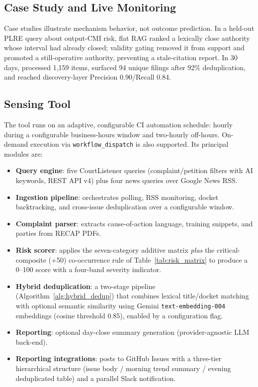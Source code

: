 \subsection{Case Study and Live Monitoring}

Case studies illustrate mechanism behavior, not outcome prediction. In a held-out PLRE query about output-CMI risk, flat RAG ranked a lexically close authority whose interval had already closed; validity gating removed it from support and promoted a still-operative authority, preventing a stale-citation report. In 30 days, \trackername{} processed 1{,}159 items, surfaced 94 unique filings after 92\% deduplication, and reached discovery-layer Precision 0.90/Recall 0.84.

\subsection{Sensing Tool}


The \trackername{} tool runs on an adaptive, configurable CI automation schedule: hourly during a configurable business-hours window and two-hourly off-hours. On-demand execution via \texttt{workflow\_dispatch} is also supported. Its principal modules are:

\begin{itemize}
  \item \textbf{Query engine}: five CourtListener queries (complaint/petition filters with AI keywords, REST API v4) plus four news queries over Google News RSS.
  \item \textbf{Ingestion pipeline}: orchestrates polling, RSS monitoring, docket backtracking, and cross-issue deduplication over a configurable window.
  \item \textbf{Complaint parser}: extracts cause-of-action language, training snippets, and parties from RECAP PDFs.
  \item \textbf{Risk scorer}: applies the seven-category additive matrix \emph{plus} the critical-composite (+50) co-occurrence rule of Table~\ref{tab:risk_matrix} to produce a 0--100 score with a four-band severity indicator.
  \item \textbf{Hybrid deduplication}: a two-stage pipeline (Algorithm~\ref{alg:hybrid_dedup}) that combines lexical title/docket matching with optional semantic similarity using Gemini \texttt{text-embedding-004} embeddings (cosine threshold 0.85), enabled by a configuration flag.
  \item \textbf{Reporting}: optional day-close summary generation (provider-agnostic LLM back-end).
  \item \textbf{Reporting integrations}: posts to GitHub Issues with a three-tier hierarchical structure (issue body / morning trend summary / evening deduplicated table) and a parallel Slack notification.
\end{itemize}

